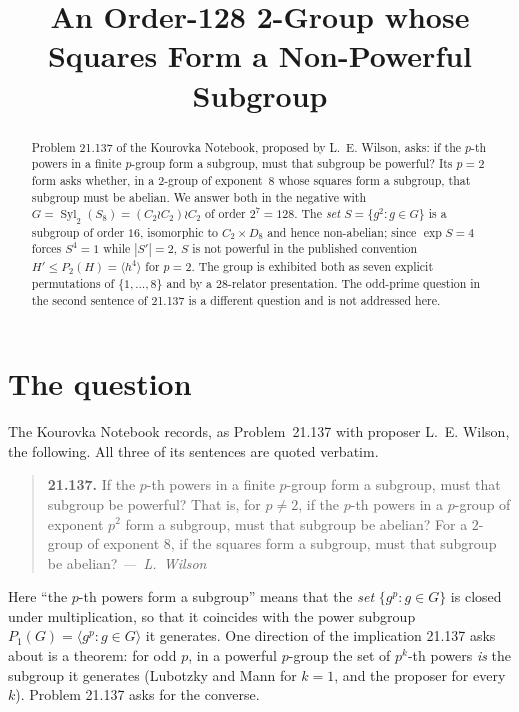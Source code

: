 \documentclass[11pt]{amsart}
\title[A 2-group whose squares are not powerful]
{An Order-128 2-Group whose Squares Form a Non-Powerful Subgroup}
\date{}
\theoremstyle{remark}
\DeclareMathOperator{\Syl}{Syl}
\begin{document}
\begin{abstract}
Problem 21.137 of the Kourovka Notebook, proposed by L.~E. Wilson, asks: if the
$p$\nobreakdash-th powers in a finite $p$-group form a subgroup, must that subgroup be
powerful? Its $p=2$ form asks whether, in a $2$-group of exponent~$8$ whose squares form a
subgroup, that subgroup must be abelian. We answer both in the negative with
$G=\Syl_2(S_8)=(C_2\wr C_2)\wr C_2$ of order $2^7=128$. The \emph{set} $S=\{g^2:g\in G\}$ is a subgroup of order $16$, isomorphic to $C_2\times D_8$
and hence non-abelian; since $\exp S=4$ forces $S^4=1$ while $|S'|=2$, $S$ is not powerful
in the published convention $H'\le P_2(H)=\langle h^4\rangle$ for $p=2$. The group is
exhibited both as seven explicit permutations of $\{1,\dots,8\}$ and by a $28$-relator
presentation. The odd-prime question in the second
sentence of 21.137 is a different question and is not addressed here.
\end{abstract}

\maketitle

\section{The question}

The Kourovka Notebook \cite{Kourovka} records, as Problem~21.137 with proposer
L.~E. Wilson, the following. All three of its sentences are quoted verbatim.

\begin{quote}
\textbf{21.137.} If the $p$-th powers in a finite $p$-group form a subgroup, must that
subgroup be powerful? That is, for $p\ne2$, if the $p$-th powers in a $p$-group of exponent
$p^2$ form a subgroup, must that subgroup be abelian? For a $2$-group of exponent $8$, if
the squares form a subgroup, must that subgroup be abelian? \emph{---~L.~Wilson}
\end{quote}

Here ``the $p$-th powers form a subgroup'' means that the \emph{set}
$\{g^p:g\in G\}$ is closed under multiplication, so that it coincides with the power
subgroup $P_1(G)=\langle g^p:g\in G\rangle$ it generates. One direction of the implication
21.137 asks about is a theorem: for odd $p$, in a powerful $p$-group the set of $p^k$-th
powers \emph{is} the subgroup it generates (Lubotzky and Mann \cite{LubotzkyMann} for $k=1$,
and the proposer \cite[Thm.~3.1]{Wilson2002} for every $k$). Problem 21.137 asks for the
converse.
\end{document}
